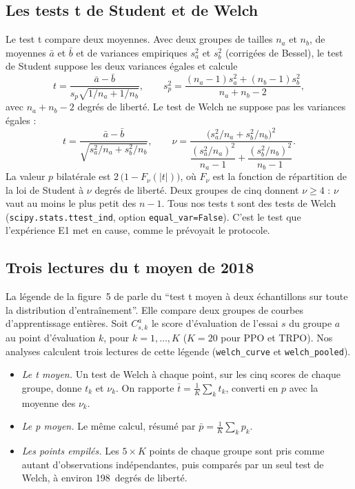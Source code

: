 
\subsection{Les tests t de Student et de Welch}\label{sec:welch}
Le test t compare deux moyennes. Avec deux groupes de tailles $n_a$ et $n_b$, de moyennes $\bar a$ et $\bar b$
et de variances empiriques $s_a^2$ et $s_b^2$ (corrigées de Bessel), le test de Student
\parencite{student1908probable} suppose les deux variances égales et calcule
\begin{equation}\label{eq:student}
  t = \frac{\bar a-\bar b}{s_p\sqrt{1/n_a+1/n_b}},\qquad
  s_p^2=\frac{(n_a-1)s_a^2+(n_b-1)s_b^2}{n_a+n_b-2},
\end{equation}
avec $n_a+n_b-2$ degrés de liberté. Le test de Welch \parencite{welch1947generalization} ne suppose pas les
variances égales :
\begin{equation}\label{eq:welch}
  t = \frac{\bar a-\bar b}{\sqrt{s_a^2/n_a+s_b^2/n_b}},\qquad
  \nu = \frac{\bigl(s_a^2/n_a+s_b^2/n_b\bigr)^2}{\dfrac{(s_a^2/n_a)^2}{n_a-1}+\dfrac{(s_b^2/n_b)^2}{n_b-1}} .
\end{equation}
La valeur $p$ bilatérale est $2\,\bigl(1-F_\nu(|t|)\bigr)$, où $F_\nu$ est la fonction de répartition de la
loi de Student à $\nu$ degrés de liberté. Deux groupes de cinq donnent $\nu\ge 4$ : $\nu$ vaut au moins le plus
petit des $n-1$. Tous nos tests t sont des tests de Welch (\texttt{scipy.stats.ttest\_ind}, option
\texttt{equal\_var=False}). C'est le test que l'expérience E1 met en cause, comme le prévoyait le protocole.

\subsection{Trois lectures du t moyen de 2018}\label{sec:t-moyen}
La légende de la figure~5 de \textcite{henderson2018matters} parle du \enquote{test t moyen à deux
échantillons sur toute la distribution d'entraînement}. Elle compare deux groupes de courbes d'apprentissage entières.
Soit $C^a_{s,k}$ le score d'évaluation de l'essai $s$ du groupe $a$ au point
d'évaluation $k$, pour $k=1,\dots,K$ ($K=20$ pour PPO et TRPO). Nos analyses calculent trois lectures de cette
légende (\texttt{welch\_curve} et \texttt{welch\_pooled}).
\begin{itemize}
  \item \emph{Le t moyen.} Un test de Welch à chaque point, sur les cinq scores de chaque groupe, donne $t_k$ et
    $\nu_k$. On rapporte $\bar t = \frac1K\sum_k t_k$, converti en $p$ avec la moyenne des $\nu_k$.
  \item \emph{Le p moyen.} Le même calcul, résumé par $\bar p = \frac1K\sum_k p_k$.
  \item \emph{Les points empilés.} Les $5\times K$ points de chaque groupe sont pris comme autant
    d'observations indépendantes, puis comparés par un seul test de Welch, à environ 198~degrés de liberté.
\end{itemize}

